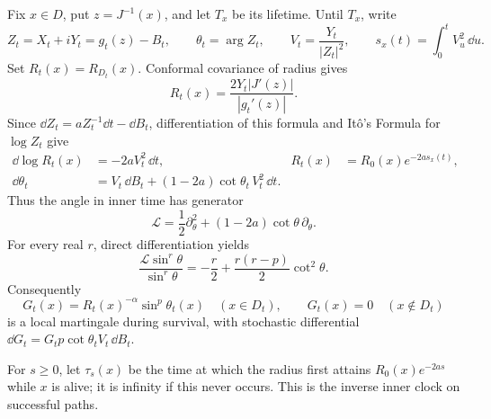 Fix $x\in D$, put $z=J^{-1}(x)$, and let $T_x$ be its lifetime. Until
$T_x$, write
\[
 Z_t=X_t+iY_t=g_t(z)-B_t,\qquad
 \theta_t=\arg Z_t,\qquad V_t=\frac{Y_t}{|Z_t|^2},\qquad
 s_x(t)=\int_0^t V_u^2\,\dd u.
\]
Set $R_t(x)=R_{D_t}(x)$. Conformal covariance of radius gives
\[
 R_t(x)=\frac{2Y_t|J'(z)|}{|g_t'(z)|}.
\]
Since $\dd Z_t=aZ_t^{-1}\dd t-\dd B_t$, differentiation of this
formula and It\^o's Formula for $\log Z_t$ give
\begin{align}
 \dd\log R_t(x)&=-2aV_t^2\,\dd t,
 &R_t(x)&=R_0(x)e^{-2as_x(t)},\label{op:radius-clock}\\
 \dd\theta_t&=V_t\,\dd B_t+(1-2a)\cot\theta_t\,V_t^2\,\dd t.
 \label{op:angle-sde}
\end{align}
Thus the angle in inner time has generator
\[
 \mathcal L=\frac12\partial_\theta^2
                +(1-2a)\cot\theta\,\partial_\theta.
\]
For every real $r$, direct differentiation yields
\begin{equation}
 \frac{\mathcal L\sin^r\theta}{\sin^r\theta}
 =-\frac r2+\frac{r(r-p)}2\cot^2\theta.
 \label{op:sine-generator}
\end{equation}
Consequently
\begin{equation}
 G_t(x)=R_t(x)^{-\alpha}\sin^p\theta_t(x)
 \quad (x\in D_t),\qquad G_t(x)=0\quad(x\notin D_t)
 \label{op:green}
\end{equation}
is a local martingale during survival, with stochastic differential
$\dd G_t=G_t p\cot\theta_t V_t\,\dd B_t$.

For $s\ge0$, let $\tau_s(x)$ be the time at which the radius first
attains $R_0(x)e^{-2as}$ while $x$ is alive; it is infinity if this
never occurs. This is the inverse inner clock on successful paths.

